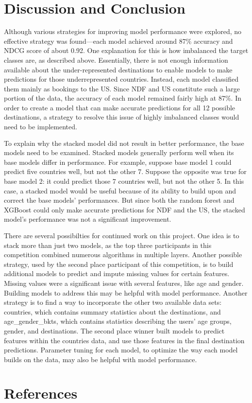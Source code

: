 \documentclass{article}
\begin{document}
\section{Discussion and Conclusion}

Although various strategies for improving model performance were explored, no effective strategy was found---each model achieved around 87\% accuracy and NDCG score of about 0.92. One explanation for this is how imbalanced the target classes are, as described above. Essentially, there is not enough information available about the under-represented destinations to enable models to make predictions for those underrepresented countries. Instead, each model classified them mainly as bookings 
to the US. Since NDF and US constitute such a large portion of the data, the accuracy of each model 
remained fairly high at 87\%. In order to create a model that can make accurate predictions for all 12 possible 
destinations, a strategy to resolve this issue of highly imbalanced classes would need to be implemented.

To explain why the stacked model did not result in better performance, the base models need to be examined. 
Stacked models generally perform well when its base models differ in performance. For example, suppose base model 1
could predict five countries well, but not the other 7. Suppose the opposite was true for base model 2: it could predict those 7 countries well, but not the other 5. In this case, a stacked model would be useful because of its ability to build upon and 
correct the base models' performances. But since both the random forest and XGBoost could only make accurate predictions 
for NDF and the US, the stacked model's performance was not a significant improvement. 

There are several possibilties for continued work on this project. One idea is to stack more than just two models, as the top three participants in this competition combined numerous algorithms in multiple layers. Another possible strategy, used by the second place participant of this competition, is to build additional models to predict and impute missing values for certain features. Missing values were a significant issue with several features, like age and gender. Building models to address this may be helpful with model performance. Another strategy is to find a way to incorporate the other two available data sets: countries, which contains summary statistics about the destinations, and age\_gender\_bkts, which contains statistics describing the users' age groups, gender, and destinations. The second place winner built models to predict features within the countries data, and use those features in the final destination predictions. Parameter tuning for each model, to optimize the way each model builds on the data, may also be helpful with model performance.  




\section{References}
\end{document}
